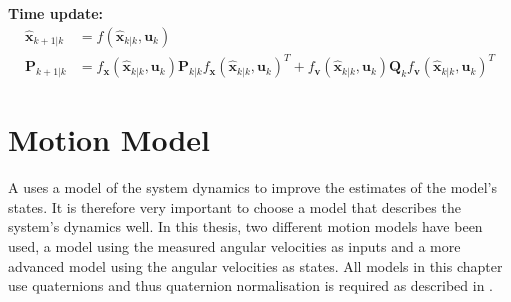 \begin{algorithm}
   \textbf{Time update:}
    \begin{align*}
    \hat{\boldsymbol{x}}_{k+1|k} &= f(\hat{\boldsymbol{x}}_{k|k},\boldsymbol{u}_{k})\\
    \boldsymbol{P}_{k+1|k} &= f_{\boldsymbol{x}}(\hat{\boldsymbol{x}}_{k|k},\boldsymbol{u}_ {k})\boldsymbol{P}_{k|k} f_{\boldsymbol{x}}(\hat{\boldsymbol{x}}_{k|k},\boldsymbol{u}_{k})^{T} + f_{\boldsymbol{v}}(\hat{\boldsymbol{x}}_{k|k},\boldsymbol{u}_{k}) \boldsymbol{Q}_{k} f_{\boldsymbol{v}}(\hat{\boldsymbol{x}}_{k|k},\boldsymbol{u}_{k})^{T}
    \end{align*}    
\end{algorithm}

\section{Motion Model}\label{sec:motion_model}
A \abbrKF uses a model of the system dynamics to improve the estimates of the model's states. It is therefore very important to choose a model that describes the system's dynamics well. In this thesis, two different motion models have been used, a model using the measured angular velocities as inputs and a more advanced model using the angular velocities as states. All models in this chapter use quaternions and thus quaternion normalisation is required as described in .

